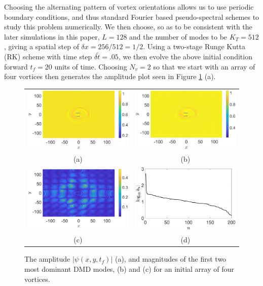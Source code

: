 \documentclass[a4paper,11pt]{article}
\begin{document}
Choosing the alternating pattern of vortex orientations allows us to use periodic boundary conditions, and thus standard Fourier based pseudo-spectral schemes to study this problem numerically.  We then choose, so as to be consistent with the later simulations in this paper, $L=128$ and the number of modes to be $K_{T}=512$, giving a spatial step of $\delta x = 256/512=1/2$.  Using a two-stage Runge Kutta (RK) scheme with time step $\delta\tilde{t} = .05$, we then evolve the above initial condition forward $t_{f}=20$ units of time.  Choosing $N_{v}=2$ so that we start with an array of four vortices then generates the amplitude plot seen in Figure \ref{fig:frvtx} (a).
\begin{figure}
\centering
\begin{tabular}{cc}
\includegraphics[width=.51\textwidth]{four_vortex_tf_20_K_256_Llx_128} &\hspace{-15pt} \includegraphics[width=.51\textwidth]{dmd1_four_vortex_tf_20_K_256_Llx_128}\\
(a) & (b)\\
 \includegraphics[width=.51\textwidth]{dmd2_four_vortex_tf_20_K_256_Llx_128} &\hspace{-15pt} \includegraphics[width=.51\textwidth]{dmd_mags_tf_20_K_256_Llx_128}\\
(c) & (d) 
\end{tabular}
\caption{The amplitude $\left|\psi(x,y,t_{f})\right|$ (a), and magnitudes of the first two most dominant DMD modes, (b) and (c) for an initial array of four vortices.  }
\label{fig:frvtx}
\end{figure}
\end{document}
